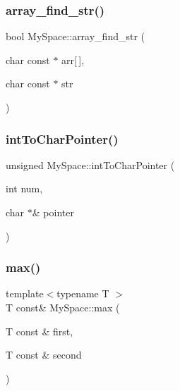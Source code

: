 \subsubsection{\texorpdfstring{array\+\_\+find\+\_\+str()}{array\_find\_str()}}
{\footnotesize\ttfamily bool My\+Space\+::array\+\_\+find\+\_\+str (\begin{DoxyParamCaption}\item[{char const $\ast$}]{arr\mbox{[}$\,$\mbox{]},  }\item[{char const $\ast$}]{str }\end{DoxyParamCaption})}

\mbox{\label{namespaceMySpace_a1e7c3c88bd9a9409c2165151610c0181}} 
\subsubsection{\texorpdfstring{int\+To\+Char\+Pointer()}{intToCharPointer()}}
{\footnotesize\ttfamily unsigned My\+Space\+::int\+To\+Char\+Pointer (\begin{DoxyParamCaption}\item[{int}]{num,  }\item[{char $\ast$\&}]{pointer }\end{DoxyParamCaption})}

\mbox{\label{namespaceMySpace_a8a8164e21fbd934574e90bcbb473244e}} 
\subsubsection{\texorpdfstring{max()}{max()}}
{\footnotesize\ttfamily template$<$typename T $>$ \\
T const\& My\+Space\+::max (\begin{DoxyParamCaption}\item[{T const \&}]{first,  }\item[{T const \&}]{second }\end{DoxyParamCaption})}

\mbox{\label{namespaceMySpace_af413b7b37194be22c25673cf245a89d3}} 

